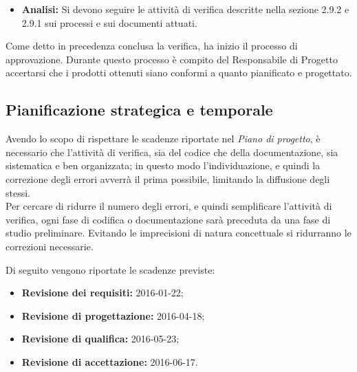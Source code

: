 \documentclass[a4paper]{article}
\begin{document}
			\begin{itemize}
				\item \textbf{Analisi:} Si devono seguire le attività di verifica descritte nella sezione 2.9.2 e 2.9.1 sui processi 
				e sui documenti attuati.
			\end{itemize}
			
			Come detto in precedenza conclusa la verifica, ha inizio il processo di approvazione. Durante questo processo è compito 
			del Responsabile di Progetto accertarsi che i prodotti ottenuti siano conformi a quanto pianificato e progettato.
		
		
		\subsection{Pianificazione strategica e temporale}
			Avendo lo scopo di rispettare le scadenze riportate nel \emph{Piano di progetto}, è necessario che l'attività 
			di verifica, sia del codice che della documentazione, sia sistematica e ben organizzata; in questo modo 
			l'individuazione, e quindi la correzione degli errori avverrà il prima possibile, limitando la diffusione 
			degli stessi.\\
			Per cercare di ridurre il numero degli errori, e quindi semplificare l'attività di verifica, ogni fase 
			di codifica o documentazione sarà preceduta da una fase di studio preliminare. Evitando le imprecisioni 
			di natura concettuale si ridurranno le correzioni necessarie.
			
			Di seguito vengono riportate le scadenze previste:
			\begin{itemize}
				\item \textbf{Revisione dei requisiti:} 2016-01-22;
				\item \textbf{Revisione di progettazione:} 2016-04-18;
				\item \textbf{Revisione di qualifica:} 2016-05-23;
				\item \textbf{Revisione di accettazione:} 2016-06-17.
			\end{itemize}
\end{document}
